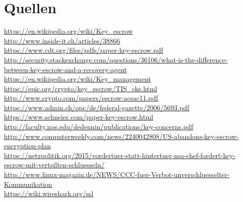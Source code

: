 \documentclass[a4paper, 10pt, fleqn]{article}
\begin{document}
\section*{Quellen}


\url{https://en.wikipedia.org/wiki/Key_escrow}\\ %
\url{http://www.inside-it.ch/articles/38866}\\%
\url{https://www.cdt.org/files/pdfs/paper-key-escrow.pdf}\\%
\url{http://security.stackexchange.com/questions/36106/what-is-the-difference-between-key-escrow-and-a-recovery-agent}\\%
\url{https://en.wikipedia.org/wiki/Key_management}\\%
\url{https://epic.org/crypto/key_escrow/TIS_cke.html}\\%
\url{http://www.crypto.com/papers/escrow-acsac11.pdf}\\%
\url{https://www.admin.ch/opc/de/federal-gazette/2006/5693.pdf} \\%
\url{https://www.schneier.com/paper-key-escrow.html} \\ %
\url{http://faculty.nps.edu/dedennin/publications/key-concerns.pdf} \\ %
\url{http://www.computerweekly.com/news/2240042808/US-abandons-key-escrow-encryption-plan} \\%
\url{https://netzpolitik.org/2015/vordertuer-statt-hintertuer-nsa-chef-fordert-key-escrow-mit-verteilten-schluesseln/} \\%
\url{http://www.linux-magazin.de/NEWS/CCC-fuer-Verbot-unverschluesselter-Kommunikation} \\ %
\url{https://wiki.wireshark.org/ssl}%
\end{document}
